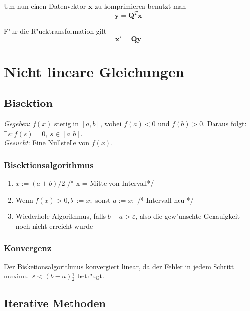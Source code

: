 \documentclass[german, 10pt, a4paper, twocolumn]{scrartcl}
\begin{document}
Um nun einen Datenvektor $\mathbf{x}$  zu komprimieren benutzt man
\begin{displaymath}
	\mathbf{y} = \mathbf{Q}^T \mathbf{x}
\end{displaymath}

F"ur die R"ucktransformation gilt
\begin{displaymath}
	\mathbf{x}' = \mathbf{Q} \mathbf{y}
\end{displaymath}

\section{Nicht lineare Gleichungen}

\subsection{Bisektion}

\textit{Gegeben}: $f(x)$ stetig in $[a,b]$, wobei $f(a) < 0$ und $f(b) > 0$. Daraus folgt: $\exists s: f(s)=0,\: s\in[a,b]$.\\

\textit{Gesucht}: Eine Nullstelle von $f(x)$.

\subsubsection{Bisektionsalgorithmus}

\begin{enumerate}
	\item $x := (a+b)/2$ /* x = Mitte von Intervall*/
	\item Wenn $f(x)>0, b\ := x;$ sonst $a:=x;$ /* Intervall neu */
	\item Wiederhole Algorithmus, falls $b-a > \varepsilon$, also die gew"unschte Genauigkeit noch nicht erreicht wurde
\end{enumerate}

\subsubsection{Konvergenz}

Der Bisketionsalgorithmus konvergiert linear, da der Fehler in jedem Schritt maximal $\varepsilon < (b-a)\frac{1}{2}$ betr"agt.

\subsection{Iterative Methoden}
\end{document}
